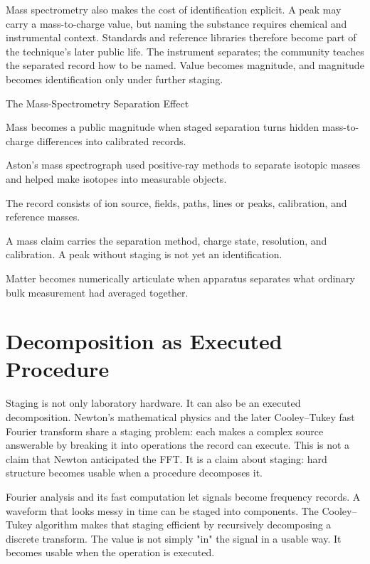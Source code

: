 Mass spectrometry also makes the cost of identification explicit. A peak
may carry a mass-to-charge value, but naming the substance requires
chemical and instrumental context. Standards and reference libraries
therefore become part of the technique's later public life. The instrument
separates; the community teaches the separated record how to be named.
Value becomes magnitude, and magnitude becomes identification only under
further staging.

\begin{phenom}{The Mass-Spectrometry Separation Effect~\cite{aston1919}}
\label{ph:mass-spectrometry-separation}

\PhStatement
Mass becomes a public magnitude when staged separation turns hidden
mass-to-charge differences into calibrated records.

\PhOrigin
Aston's mass spectrograph used positive-ray methods to separate isotopic
masses and helped make isotopes into measurable objects.

\PhObservation
The record consists of ion source, fields, paths, lines or peaks, calibration,
and reference masses.

\PhConstraint
A mass claim carries the separation method, charge state, resolution, and
calibration. A peak without staging is not yet an identification.

\PhConsequence
Matter becomes numerically articulate when apparatus separates what ordinary
bulk measurement had averaged together.
\end{phenom}

\section{Decomposition as Executed Procedure}

Staging is not only laboratory hardware. It can also be an executed
decomposition. Newton's mathematical physics and the later Cooley--Tukey fast
Fourier transform share a staging problem: each makes a complex source
answerable by breaking it into operations the record can execute. This is not
a claim that Newton anticipated the FFT. It is a claim about staging: hard
structure becomes usable when a procedure decomposes it.

Fourier analysis and its fast computation let signals become frequency
records. A waveform that looks messy in time can be staged into components.
The Cooley--Tukey algorithm makes that staging efficient by recursively
decomposing a discrete transform. The value is not simply "in" the signal in a
usable way. It becomes usable when the operation is executed.

